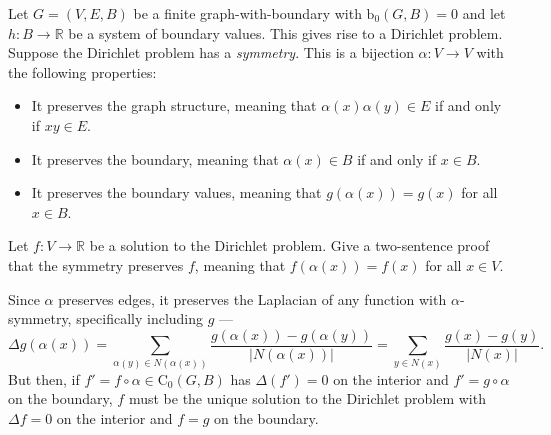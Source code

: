\documentclass[12 pt, letterpaper]{hmcpset}
\begin{document}
\pagebreak

\begin{problem}[36.]
	Let $G = (V, E, B)$ be a finite graph-with-boundary with $\mathrm{b}_{0}(G, B) = 0$ and let $h : B \to \mathbb{R}$ be a system of boundary values. This gives rise to a Dirichlet problem. Suppose the Dirichlet problem has a \emph{symmetry}. This is a bijection $\alpha : V \to V$ with the following properties:
	\begin{itemize}
		\item It preserves the graph structure, meaning that $\alpha(x) \alpha(y) \in E$ if and only if $xy \in E$.
		\item It preserves the boundary, meaning that $\alpha(x) \in B$ if and only if $x \in B$.
		\item It preserves the boundary values, meaning that $g(\alpha(x)) = g(x)$ for all $x \in B$.
	\end{itemize}
	Let $f : V \to \mathbb{R}$ be a solution to the Dirichlet problem. Give a two-sentence proof that the symmetry preserves $f$, meaning that $f(\alpha(x)) = f(x)$ for all $x \in V$.
\end{problem}

\begin{solution}
	Since $\alpha$ preserves edges, it preserves the Laplacian of any function with $\alpha$-symmetry, specifically including $g$ ---
	\[
		\Delta g(\alpha(x)) = \sum_{\alpha(y) \in N(\alpha(x))} \frac{g(\alpha(x)) - g(\alpha(y))}{\lvert N(\alpha(x)) \rvert} = \sum_{y \in N(x)} \frac{g(x) - g(y)}{\lvert N(x) \rvert}.
	\]
	But then, if $f' = f \circ \alpha \in \mathrm{C}_{0}(G, B)$ has $\Delta(f') = 0$ on the interior and $f' = g \circ \alpha$ on the boundary, $f$ must be the unique solution to the Dirichlet problem with $\Delta f = 0$ on the interior and $f = g$ on the boundary.
\end{solution}

\pagebreak
\end{document}
